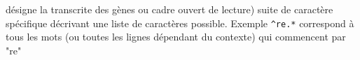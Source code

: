 \newcommand{\w}{\acrshort{omega}}

 {désigne la transcrite des gènes ou cadre ouvert de lecture)}
 {suite de caractère spécifique décrivant une liste de caractères possible. Exemple \lstinline{^re.*} correspond à tous les mots (ou toutes les lignes dépendant du contexte) qui commencent par "re"}



